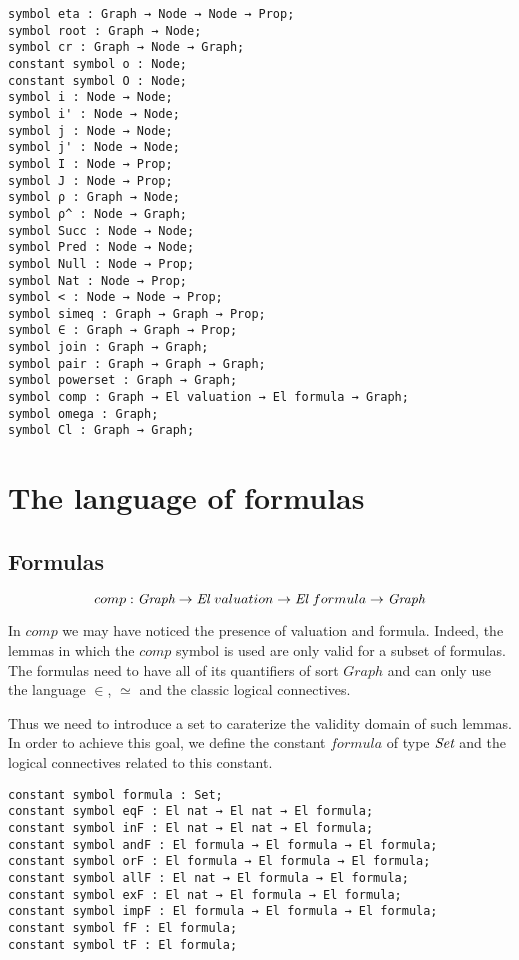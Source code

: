\documentclass[a4paper]{article}
\begin{document}
\begin{lstlisting}
symbol eta : Graph → Node → Node → Prop;
symbol root : Graph → Node;
symbol cr : Graph → Node → Graph;
constant symbol o : Node;
constant symbol O : Node;
symbol i : Node → Node;
symbol i' : Node → Node;
symbol j : Node → Node;
symbol j' : Node → Node;
symbol I : Node → Prop;
symbol J : Node → Prop;
symbol ρ : Graph → Node;
symbol ρ^ : Node → Graph;
symbol Succ : Node → Node;
symbol Pred : Node → Node;
symbol Null : Node → Prop;
symbol Nat : Node → Prop;
symbol < : Node → Node → Prop;
symbol simeq : Graph → Graph → Prop;
symbol ∈ : Graph → Graph → Prop;
symbol join : Graph → Graph;
symbol pair : Graph → Graph → Graph;
symbol powerset : Graph → Graph;
symbol comp : Graph → El valuation → El formula → Graph;
symbol omega : Graph;
symbol Cl : Graph → Graph;
\end{lstlisting}


\section{The language of formulas}
\subsection{Formulas}

$$comp : {\mbox{\it Graph}} \rightarrow {\mbox{\it El}} \ valuation \rightarrow {\mbox{\it El}} \ formula \rightarrow {\mbox{\it Graph}}$$

In $comp$ we may have noticed the presence of valuation and formula. 
Indeed, the lemmas in which the $comp$ symbol is used are only valid for a subset of formulas. The formulas need to have all of its quantifiers of sort $Graph$ and can only use the language $\in$, $\simeq$ and the classic logical connectives.

Thus we need to introduce a set to caraterize the validity domain of such lemmas. In order to achieve this goal, we define the constant $formula$ of type $\mbox{\it Set}$ and the logical connectives related to this constant.

\begin{lstlisting}
constant symbol formula : Set;
constant symbol eqF : El nat → El nat → El formula;
constant symbol inF : El nat → El nat → El formula;
constant symbol andF : El formula → El formula → El formula;
constant symbol orF : El formula → El formula → El formula;
constant symbol allF : El nat → El formula → El formula;
constant symbol exF : El nat → El formula → El formula;
constant symbol impF : El formula → El formula → El formula;
constant symbol fF : El formula;
constant symbol tF : El formula;
\end{lstlisting}
\end{document}
